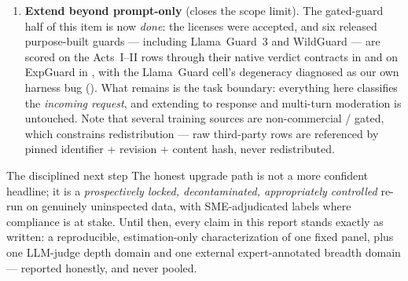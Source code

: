 \begin{enumerate}[leftmargin=1.9em,itemsep=3pt]
  \item \textbf{Extend beyond prompt-only} (closes the scope limit). The gated-guard half of this item is now \emph{done}: the licenses were accepted, and six released purpose-built guards --- including Llama~Guard~3 and WildGuard --- are scored on the Acts~I--II rows through their native verdict contracts in  and on ExpGuard in , with the Llama~Guard cell's degeneracy diagnosed as our own harness bug (). What remains is the task boundary: everything here classifies the \emph{incoming request}, and extending to response and multi-turn moderation is untouched. Note that several training sources are non-commercial / gated, which constrains redistribution --- raw third-party rows are referenced by pinned identifier + revision + content hash, never redistributed.
\end{enumerate}

\begin{takeaway}{The disciplined next step}
The honest upgrade path is not a more confident headline; it is a \emph{prospectively locked, decontaminated, appropriately controlled} re-run on genuinely uninspected data, with SME-adjudicated labels where compliance is at stake. Until then, every claim in this report stands exactly as written: a reproducible, estimation-only characterization of one fixed panel, plus one LLM-judge depth domain and one external expert-annotated breadth domain --- reported honestly, and never pooled.
\end{takeaway}
